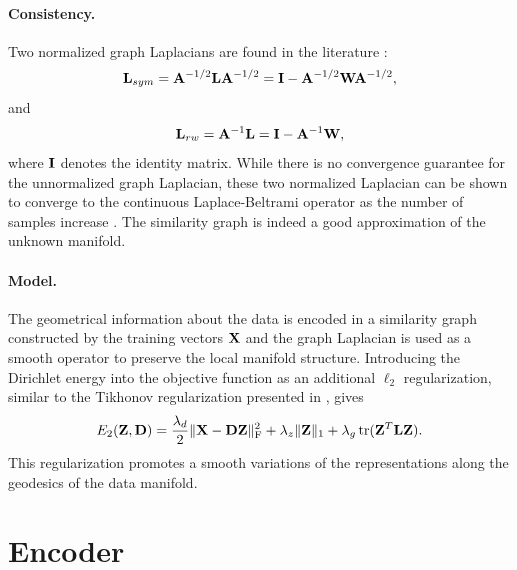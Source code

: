\paragraph{Consistency.}
Two normalized graph Laplacians are found in the literature \cite{chung1997spectralGraphTheory}:
\begin{equation}
	\mathbf{L}_{sym} = \mathbf{A}^{-1/2} \mathbf{L} \mathbf{A}^{-1/2} = \mathbf{I} - \mathbf{A}^{-1/2} \mathbf{W} \mathbf{A}^{-1/2},
\end{equation}
and
\begin{equation}
	\mathbf{L}_{rw} = \mathbf{A}^{-1} \mathbf{L} = \mathbf{I} - \mathbf{A}^{-1} \mathbf{W},
\end{equation}
where $\mathbf{I}$ denotes the identity matrix.
While there is no convergence guarantee for the unnormalized graph Laplacian, these two normalized Laplacian can be shown to converge to the continuous Laplace-Beltrami operator as the number of samples increase \cite{vonluxburg2008consistency}. The similarity graph is indeed a good approximation of the unknown manifold.

\paragraph{Model.}
The geometrical information about the data is encoded in a similarity graph constructed by the training vectors $\mathbf{X}$ and the graph Laplacian is used as a smooth operator to preserve the local manifold structure. Introducing the Dirichlet energy into the objective function as an additional $\ell_2$ regularization, similar to the Tikhonov regularization presented in , gives
\begin{equation}\label{eqn:en_structure}
	E_2(\mathbf{Z}, \mathbf{D}) = \frac{\lambda_d}{2} \| \mathbf{X} - \mathbf{D} \mathbf{Z} \|_\text{F}^2 + \lambda_z \| \mathbf{Z} \|_1 + \lambda_g \operatorname*{tr}(\mathbf{Z}^T \mathbf{L} \mathbf{Z}).
\end{equation}
This regularization promotes a smooth variations of the representations along the geodesics of the data manifold.

\section{Encoder} \label{sec:encoder}

